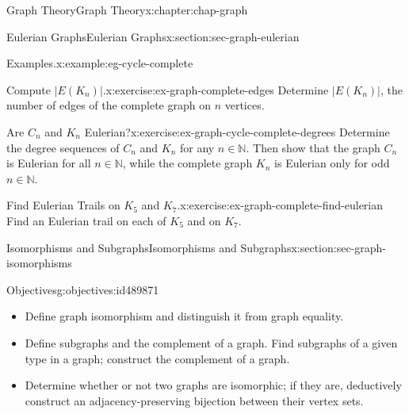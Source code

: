 \documentclass[oneside,10pt,]{book}
\numberwithin{equation}{section}
\begin{document}
\begin{chapterptx}{Graph Theory}{}{Graph Theory}{}{}{x:chapter:chap-graph}
\begin{sectionptx}{Eulerian Graphs}{}{Eulerian Graphs}{}{}{x:section:sec-graph-eulerian}
\begin{example}{Examples.}{x:example:eg-cycle-complete}
\begin{sidebyside}{4}{0.035}{0.035}{0.07}
\begin{sbspanel}{0.2}
{
}%
\end{sbspanel}%
\end{sidebyside}%
\end{example}
\begin{inlineexercise}{Compute \(|E(K_n)|\).}{x:exercise:ex-graph-complete-edges}%
Determine \(|E(K_n)|\), the number of edges of the complete graph on \(n\) vertices.%
\end{inlineexercise}
\begin{inlineexercise}{Are \(C_n\) and \(K_n\) Eulerian?}{x:exercise:ex-graph-cycle-complete-degrees}%
Determine the degree sequences of \(C_n\) and \(K_n\) for any \(n \in \mathbb{N}\). Then show that the graph \(C_n\) is Eulerian for all \(n \in \mathbb{N}\), while the complete graph \(K_n\) is Eulerian only for odd \(n \in \mathbb{N}\).%
\end{inlineexercise}
\begin{inlineexercise}{Find Eulerian Trails on \(K_5\) and \(K_7\).}{x:exercise:ex-graph-complete-find-eulerian}%
Find an Eulerian trail on each of \(K_5\) and on \(K_7\).%
\end{inlineexercise}
\end{sectionptx}
%
%
\typeout{************************************************}
\typeout{************************************************}
%
\begin{sectionptx}{Isomorphisms and Subgraphs}{}{Isomorphisms and Subgraphs}{}{}{x:section:sec-graph-isomorphisms}
\begin{objectives}{Objectives}{g:objectives:id489871}
%
\begin{itemize}[label=\textbullet]
\item{}Define graph isomorphism and distinguish it from graph equality.%
\item{}Define subgraphs and the complement of a graph. Find subgraphs of a given type in a graph; construct the complement of a graph.%
\item{}Determine whether or not two graphs are isomorphic; if they are, deductively construct an adjacency-preserving bijection between their vertex sets.%

\end{itemize}
\end{objectives}
\end{sectionptx}
\end{chapterptx}
\end{document}
